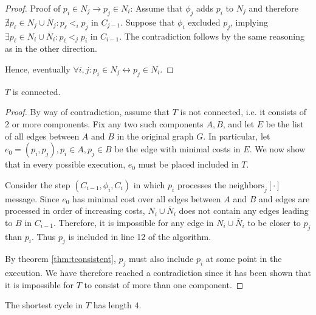 \begin{proof}
Proof of $p_i \in N_j \rightarrow p_j \in N_i$: Assume that $\phi_j$ adds
$p_i$ to $N_j$ and therefore $\nexists p_\ell \in N_j \cup \overline{N}_j: 
p_\ell <_i p_j$ in $C_{j-1}$. Suppose that $\phi_i$ excluded $p_j$, implying
$\exists p_\ell \in N_i \cup \overline{N}_i: p_\ell <_j p_i \text{ in } C_{i-1}$.
The contradiction follows by the same reasoning as in the other direction.

Hence, eventually $\forall i,j: p_i \in N_j \leftrightarrow p_j \in N_i$.
\end{proof}

\begin{theorem}
$T$ is connected.
\end{theorem}

\begin{proof}
By way of contradiction, assume that $T$ is not connected, i.e. it consists of 2
or more components. Fix any two such components $A, B$, and let $E$ be the list
of all edges between $A$ and $B$ in the original graph $G$. In particular, let
$e_0 = (p_i, p_j), p_i \in A, p_j \in B$ be the edge with minimal costs in $E$.
We now show that in every 
possible execution, $e_0$ must be placed included in $T$.

Consider the step $(C_{i-1}, \phi_i, C_i)$ in which $p_i$ processes the 
$\text{neighbors}_j[\cdot]$ message. Since $e_0$ has minimal cost over all edges
between $A$ and $B$ and edges are processed in order of increasing costs,
$N_i \cup \overline{N}_i$ does not contain any edges
leading to $B$ in $C_{i-1}$. Therefore, it is impossible for any edge in 
$N_i \cup \overline{N}_i$ to be closer to $p_j$ than $p_i$. Thus $p_j$
is included in line 12 of the algorithm.

By theorem \ref{thm:tconsistent}, $p_j$ must also include $p_i$ at some point
in the execution. We have therefore reached a contradiction since it has been
shown that it is impossible for $T$ to consist of more than one component.
\end{proof}

\begin{theorem}
The shortest cycle in $T$ has length $4$.
\end{theorem}

